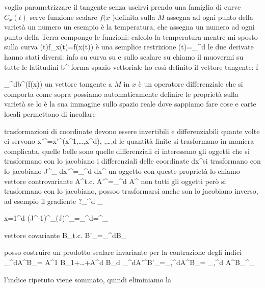 voglio parametrizzare il tangente senza uscirvi
prendo una famiglia di curve $C_x(t)$
serve funzione scalare $f(x$ )definita sulla $M$
assegna ad ogni punto della varietà un numero
un esempio è la temperatura, che assegna un numero ad ogni punto della Terra
compongo le funzioni: calcolo la temperatura mentre mi sposto sulla curva
	(t)\equiv f\circC_x(t)=f(x(t))
è una semplice restrizione
	(t)=\sum_{}^d
le due derivate hanno stati diversi: info su curva su \dv e sullo scalare su \pdv
chiamo il muovermi su tutte le latitudini
	b^\mu\equiv{}
forma spazio vettoriale
ho così definito il vettore tangente:
	 {} {f} {\sum_{^d}b^\mu{}(f(x))
un vettore tangente a $M$ in $x$ è un operatore differenziale che si comporta come sopra
possiamo automaticamente definire le proprietà sulla varietà se lo è la sua immagine sullo spazio reale dove sappiamo fare cose e carte locali permettono di incollare

trasformazioni di coordinate devono essere invertibili e differenziabili quante volte ci servono
	x'^\beta=x'^\beta(x^1,\dots,x^d), ,\dots,d
le quantità finite si trasformano in maniera complicata, quelle belle sono quelle differenziali
ci interessano gli oggetti che si trasformano con lo jacobiano
i differenziali delle coordinate dx^\mu si trasformano con lo jacobiano
	J^\beta_\alpha\equiv{}
	dx'^\mu=\sum_{}^d dx^\nu
un oggetto con queste proprietà lo chiamo vettore controvariante
	A^\alpha t.c. A'^\alpha=\sum_{}^d A^\beta
non tutti gli oggetti però si trasformano con lo jacobiano, possoo trasformarsi anche son lo jacobiano inverso, ad esempio il gradiente 
	?\sum_{}^d
	\sum_{x=1^d (J^{-1})^\sigma_\lambda(J)^\lambda_\rho=\sum_{}^d=\equiv \delta^\sigma_\rho
		
vettore covariante
	B_\alpha t.c. B'_\alpha=\sum_{}^dB_\beta

posso costruire un prodotto scalare invariante per la contrazione degli indici
	\sum_{}^dA^\mu B_\mu= A^1 B_1+\dots+A^d B_d
	\sum_{}^dA'^\mu B'_\mu=\sum_{\mu,\nu\rho}^dA^{\nu}B_\rho= \sum_{\mu,}^d A^\nu B_\rho \delta^\rho_\nu
	
l'indice ripetuto viene sommato, quindi eliminiamo la \sum

}}
